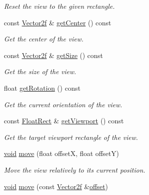 \begin{DoxyCompactItemize}
\begin{DoxyCompactList}\small\item\em Reset the view to the given rectangle. \end{DoxyCompactList}\item 
const \hyperlink{namespacesf_acf03098c2577b869e2fa6836cc48f1a0}{Vector2f} \& \hyperlink{classsf_1_1_view_adae81dede405b91bb3c487e28f536fe9}{get\-Center} () const 
\begin{DoxyCompactList}\small\item\em Get the center of the view. \end{DoxyCompactList}\item 
const \hyperlink{namespacesf_acf03098c2577b869e2fa6836cc48f1a0}{Vector2f} \& \hyperlink{classsf_1_1_view_aa130cf34676d715242bee661537a6257}{get\-Size} () const 
\begin{DoxyCompactList}\small\item\em Get the size of the view. \end{DoxyCompactList}\item 
float \hyperlink{classsf_1_1_view_a8ad320469a27f96f6f49de1c14f0978d}{get\-Rotation} () const 
\begin{DoxyCompactList}\small\item\em Get the current orientation of the view. \end{DoxyCompactList}\item 
const \hyperlink{namespacesf_aed4e58f586b2eed2621c0365d0b7554e}{Float\-Rect} \& \hyperlink{classsf_1_1_view_af1db1e4f21d104a9691fd38be9165758}{get\-Viewport} () const 
\begin{DoxyCompactList}\small\item\em Get the target viewport rectangle of the view. \end{DoxyCompactList}\item 
\hyperlink{glutf90_8h_ac778d6f63f1aaf8ebda0ce6ac821b56e}{void} \hyperlink{classsf_1_1_view_a0c82144b837caf812f7cb25a43d80c41}{move} (float offset\-X, float offset\-Y)
\begin{DoxyCompactList}\small\item\em Move the view relatively to its current position. \end{DoxyCompactList}\item 
\hyperlink{glutf90_8h_ac778d6f63f1aaf8ebda0ce6ac821b56e}{void} \hyperlink{classsf_1_1_view_a4c98a6e04fed756dfaff8f629de50862}{move} (const \hyperlink{namespacesf_acf03098c2577b869e2fa6836cc48f1a0}{Vector2f} \&\hyperlink{gl3_8h_ae1b92ae085ddef4b1cdca7d749339fb0}{offset})

\end{DoxyCompactItemize}
